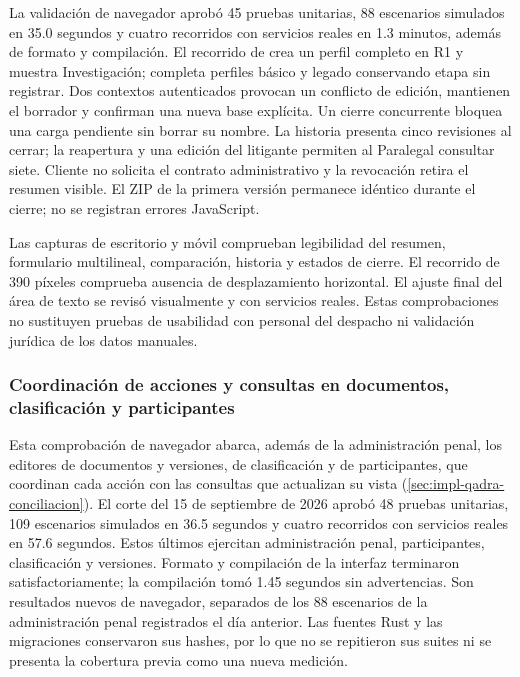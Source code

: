 La validación de navegador aprobó 45 pruebas unitarias, 88 escenarios simulados en 35.0 segundos y cuatro recorridos con servicios reales en 1.3 minutos, además de formato y compilación. El recorrido de  crea un perfil completo en R1 y muestra Investigación; completa perfiles básico y legado conservando etapa sin registrar. Dos contextos autenticados provocan un conflicto de edición, mantienen el borrador y confirman una nueva base explícita. Un cierre concurrente bloquea una carga pendiente sin borrar su nombre. La historia presenta cinco revisiones al cerrar; la reapertura y una edición del litigante permiten al Paralegal consultar siete. Cliente no solicita el contrato administrativo y la revocación retira el resumen visible. El ZIP de la primera versión permanece idéntico durante el cierre; no se registran errores JavaScript.

Las capturas de escritorio y móvil comprueban legibilidad del resumen, formulario multilineal, comparación, historia y estados de cierre. El recorrido de 390 píxeles comprueba ausencia de desplazamiento horizontal. El ajuste final del área de texto se revisó visualmente y con servicios reales. Estas comprobaciones no sustituyen pruebas de usabilidad con personal del despacho ni validación jurídica de los datos manuales.

\subsubsection{Coordinación de acciones y consultas en documentos, clasificación y participantes}\label{sec:pruebas-coordinacion-interfaz}

Esta comprobación de navegador abarca, además de la administración penal, los editores de documentos y versiones, de clasificación y de participantes, que coordinan cada acción con las consultas que actualizan su vista (\cref{sec:impl-qadra-conciliacion}). El corte del 15 de septiembre de 2026 aprobó 48 pruebas unitarias, 109 escenarios simulados en 36.5 segundos y cuatro recorridos con servicios reales en 57.6 segundos. Estos últimos ejercitan administración penal, participantes, clasificación y versiones. Formato y compilación de la interfaz terminaron satisfactoriamente; la compilación tomó 1.45 segundos sin advertencias. Son resultados nuevos de navegador, separados de los 88 escenarios de la administración penal registrados el día anterior. Las fuentes Rust y las migraciones conservaron sus hashes, por lo que no se repitieron sus suites ni se presenta la cobertura previa como una nueva medición.


